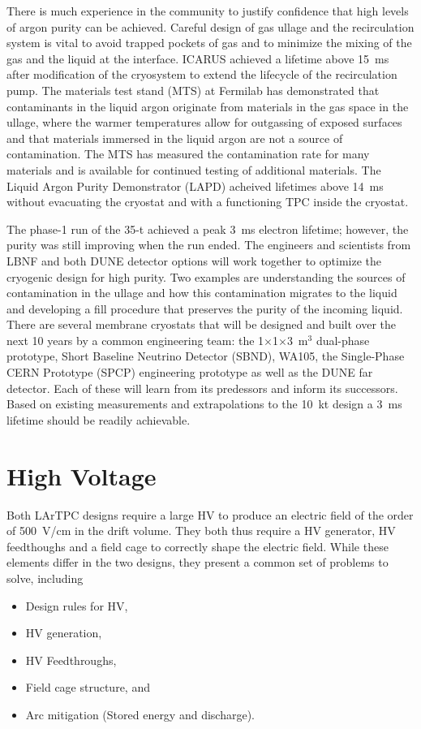 There is much experience in the community to justify confidence that
high levels of argon purity can be achieved.  Careful design of gas
ullage and the recirculation system is vital to avoid trapped pockets
of gas and to minimize the mixing of the gas and the liquid at the
interface.  ICARUS achieved a lifetime above 15~ms after modification of
the cryosystem to extend the lifecycle of the recirculation
pump.\cite{Antonello:2014eha} The materials test stand (MTS) at Fermilab has
demonstrated that contaminants in the liquid argon originate from
materials in the gas space in the ullage, where the warmer
temperatures allow for outgassing of exposed surfaces and that
materials immersed in the liquid argon are not a source of
contamination.\cite{andrewsNIM} The MTS has measured the
contamination rate for many materials and is available for
continued testing of additional materials.  The Liquid Argon Purity
Demonstrator (LAPD) acheived lifetimes above 14~ms without evacuating
the cryostat and with a functioning TPC inside the
cryostat.\cite{Bromberg:2015uia}

The phase-1 run of the 35-t achieved a peak 3~ms electron lifetime;
however, the purity was still improving when the run ended.  The
engineers and scientists from LBNF and both DUNE detector options will
work together to optimize the cryogenic design for high purity. Two
examples are understanding the sources of contamination in the ullage
and how this contamination migrates to the liquid and developing a
fill procedure that preserves the purity of the incoming liquid.
There are several membrane cryostats that will be designed and built
over the next 10 years by a common engineering team: the
1$\times$1$\times$3~m$^3$ dual-phase prototype, Short Baseline
Neutrino Detector (SBND), WA105, the Single-Phase CERN Prototype
(SPCP) engineering prototype as well as the DUNE far detector. Each of
these will learn from its predessors and inform its successors. Based
on existing measurements and extrapolations to the 10~kt design a 3~ms
lifetime should be readily achievable.


\section{High Voltage}

Both LArTPC designs require a large HV to
produce an electric field of the order of 500~V/cm in the drift
volume.  They both thus require a HV generator, HV
feedthoughs and a field cage to correctly shape the electric
field. While these elements differ in the two designs, they present a common
set of problems to solve, including
\begin{itemize}
\item Design rules for HV,
\item HV generation,
\item HV Feedthroughs,
\item Field cage structure, and
\item Arc mitigation (Stored energy and discharge).
\end{itemize}


